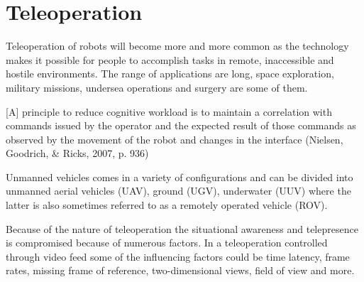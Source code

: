 \section{Teleoperation}


Teleoperation of robots will become more and more common as the technology makes it possible for people to accomplish tasks in remote, inaccessible and hostile environments. The range of applications are long, space exploration, military missions, undersea operations and surgery are some of them.

[A] principle to reduce cognitive workload is to maintain a correlation with commands issued by the operator and the expected result of those commands as observed by the movement of the robot and changes in the interface (Nielsen, Goodrich, & Ricks, 2007, p. 936)

Unmanned vehicles comes in a variety of configurations and can be divided into unmanned aerial vehicles (UAV), ground (UGV), underwater (UUV) where the latter is also sometimes referred to as a remotely operated vehicle (ROV).

Because of the nature of teleoperation the situational awareness and telepresence is compromised because of numerous factors. In a teleoperation controlled through video feed some of the influencing factors could be time latency, frame rates, missing frame of reference, two-dimensional views, field of view and more.

